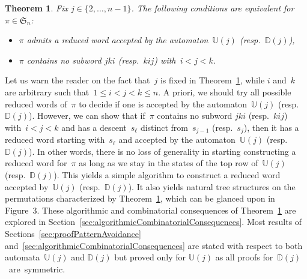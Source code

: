 \documentclass[11pt]{article}
\newtheorem{theorem}[theo]{Theorem}
\theoremstyle{definition}
\numberwithin{equation}{section}
\newcommand{\fS}{\mathfrak{S}}
\newcommand{\automatonU}{\mathbb{U}}
\newcommand{\automatonD}{\mathbb{D}}
\begin{document}
\begin{theorem}\label{thm:patternAvoidance}
Fix $j \in \{2, \dots, n-1\}$.
The following conditions are equivalent for~${\pi \in \fS_n}$:
\begin{itemize}
	\item $\pi$ admits a reduced word accepted by the automaton~$\automatonU(j)$ (resp.~$\automatonD(j)$),
	\item $\pi$ contains no subword $jki$ (resp.~$kij$) with~$i < j < k$.
\end{itemize}
\end{theorem}

Let us warn the reader on the fact that~$j$ is fixed in Theorem~\ref{thm:patternAvoidance}, while $i$ and~$k$ are arbitrary such that~$1 \le i < j < k \le n$.
A priori, we should try all possible reduced words of~$\pi$ to decide if one is accepted by the automaton~$\automatonU(j)$ (resp.~$\automatonD(j)$).
However, we can show that if~$\pi$ contains no subword $jki$ (resp.~$kij$) with~${i < j < k}$ and has a descent~$s_\ell$ distinct from~$s_{j-1}$ (resp.~$s_j$), then it has a reduced word starting with~$s_\ell$ and accepted by the automaton~$\automatonU(j)$ (resp.~$\automatonD(j)$).
In other words, there is no loss of generality in starting constructing a reduced word for~$\pi$ as long as we stay in the states of the top row of~$\automatonU(j)$ (resp.~$\automatonD(j)$).
This yields a simple algorithm to construct a reduced word accepted by~$\automatonU(j)$ (resp.~$\automatonD(j)$).
It also yields natural tree structures on the permutations characterized by Theorem~\ref{thm:patternAvoidance}, which can be glanced upon in Figure~3.
These algorithmic and combinatorial consequences of Theorem~\ref{thm:patternAvoidance} are explored in Section~\ref{sec:algorithmicCombinatorialConsequences}.
Most results of Sections~\ref{sec:proofPatternAvoidance} and~\ref{sec:algorithmicCombinatorialConsequences} are stated with respect to both automata~$\automatonU(j)$ and $\automatonD(j)$ but proved only for $\automatonU(j)$ as all proofs for~$\automatonD(j)$~are~symmetric.
\end{document}
